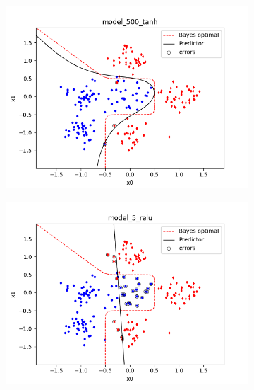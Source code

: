 \documentclass[a4paper,11pt]{article}
\begin{document}
\begin{figure}[ht]
\begin{subfigure}[b]{0.3\textwidth}
        \includegraphics[width=\textwidth]{../boundaries/model_500_tanh.png}
    \end{subfigure}
    \begin{subfigure}[b]{0.3\textwidth}
        \includegraphics[width=\textwidth]{../boundaries/model_5_relu.png}
    \end{subfigure}
    \hfill
    \begin{subfigure}[b]{0.3\textwidth}

\end{subfigure}
\end{figure}
\end{document}
